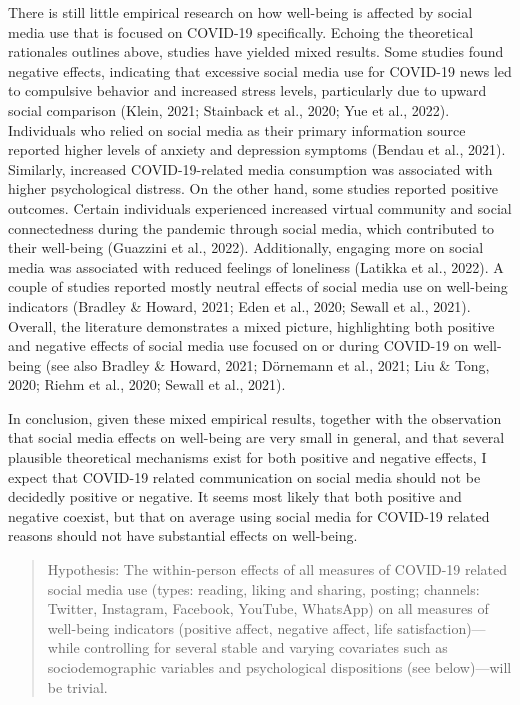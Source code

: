 \documentclass[
  man,mask,floatsintext]{apa7}
\begin{document}
There is still little empirical research on how well-being is affected by social media use that is focused on COVID-19 specifically.
Echoing the theoretical rationales outlines above, studies have yielded mixed results.
Some studies found negative effects, indicating that excessive social media use for COVID-19 news led to compulsive behavior and increased stress levels, particularly due to upward social comparison (Klein, 2021; Stainback et al., 2020; Yue et al., 2022).
Individuals who relied on social media as their primary information source reported higher levels of anxiety and depression symptoms (Bendau et al., 2021).
Similarly, increased COVID-19-related media consumption was associated with higher psychological distress.
On the other hand, some studies reported positive outcomes.
Certain individuals experienced increased virtual community and social connectedness during the pandemic through social media, which contributed to their well-being (Guazzini et al., 2022).
Additionally, engaging more on social media was associated with reduced feelings of loneliness (Latikka et al., 2022).
A couple of studies reported mostly neutral effects of social media use on well-being indicators (Bradley \& Howard, 2021; Eden et al., 2020; Sewall et al., 2021).
Overall, the literature demonstrates a mixed picture, highlighting both positive and negative effects of social media use focused on or during COVID-19 on well-being (see also Bradley \& Howard, 2021; Dörnemann et al., 2021; Liu \& Tong, 2020; Riehm et al., 2020; Sewall et al., 2021).

In conclusion, given these mixed empirical results, together with the observation that social media effects on well-being are very small in general, and that several plausible theoretical mechanisms exist for both positive and negative effects, I expect that COVID-19 related communication on social media should not be decidedly positive or negative.
It seems most likely that both positive and negative coexist, but that on average using social media for COVID-19 related reasons should not have substantial effects on well-being.

\begin{quote}
Hypothesis: The within-person effects of all measures of COVID-19 related social media use (types: reading, liking and sharing, posting; channels: Twitter, Instagram, Facebook, YouTube, WhatsApp) on all measures of well-being indicators (positive affect, negative affect, life satisfaction)---while controlling for several stable and varying covariates such as sociodemographic variables and psychological dispositions (see below)---will be trivial.
\end{quote}
\end{document}
